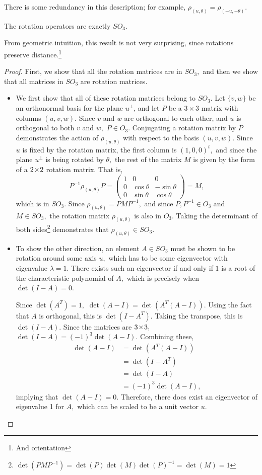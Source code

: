 There is some redundancy in this description; for example, $\rho_{(u, \theta)} = \rho_{(-u, -\theta)}.$
\begin{theorem}
The rotation operators are exactly $SO_3$.
\end{theorem}
From geometric intuition, this result is not very surprising, since rotations preserve distance.\footnote{And orientation}
\begin{proof}

First, we show that all the rotation matrices are in $SO_3,$ and then we show that all matrices in $SO_3$ are rotation matrices.
\begin{itemize}
    \item  We first show that all of these rotation matrices belong to $SO_3$. Let $\{v, w\}$ be an orthonormal basis for the plane $u^\perp$, and let $P$ be a $3\times 3$ matrix with columns $(u,v,w)$. Since $v$ and $w$ are orthogonal to each other, and $u$ is orthogonal to both $v$ and $w,$ $P \in O_3.$ Conjugating a rotation matrix by $P$ demonstrates the action of $\rho_{(u, \theta)}$ with respect to the basis $(u, v, w).$ Since $u$ is fixed by the rotation matrix, the first column is $(1, 0, 0)^t,$ and since the plane $u^{\perp}$ is being rotated by $\theta,$ the rest of the matrix $M$ is given by the form of a $2 \hspace{0.05em}{\times}\hspace{0.05em} 2$ rotation matrix. That is,
    \[
    P^{-1}\rho_{(u, \theta)}P = \begin{pmatrix} 1 & 0 & 0 \\ 0 & \cos \theta & -\sin \theta \\ 0 & \sin \theta & \cos \theta \end{pmatrix} = M,
    \] which is in $SO_3.$ Since $\rho_{(u, \theta)} = PMP^{-1},$ and since $P, P^{-1} \in O_3$ and $M \in SO_3,$ the rotation matrix $\rho_{(u, \theta)}$ is also in $O_3.$ Taking the determinant of both sides\footnote{$\det(PMP^{-1}) = \det(P)\det(M)\det(P)^{-1} = \det(M) = 1$} demonstrates that $\rho_{(u, \theta)} \in SO_3.$
    
\item 
    To show the other direction, an element $A \in SO_3$ must be shown to be rotation around some axis $u,$ which has to be some eigenvector with eigenvalue $\lambda = 1$. There exists such an eigenvector if and only if $1$ is a root of the characteristic polynomial of $A,$ which is precisely when $\det(I-A) = 0.$
    
    Since $\det(A^T) = 1,$ $\det(A - I) = \det(A^T(A - I)).$ Using the fact that $A$ is orthogonal, this is $\det(I - A^T).$ Taking the transpose, this is $\det(I - A).$ Since the matrices are $3 \hspace{0.05em}{\times}\hspace{0.05em} 3,$ $\det(I-A) = (-1)^3\det(A-I).$
    Combining these,
    \begin{align*}
        \det(A-I) &= \det(A^T (A - I)) \\
                  &= \det(I - A^T) \\
                  &= \det(I-A) \\
                  &= (-1)^3 \det(A-I),
    \end{align*}
    implying that $\det(A-I) = 0.$ Therefore, there does exist an eigenvector of eigenvalue 1 for $A,$ which can be scaled to be a unit vector $u.$


\end{itemize}
\end{proof}
